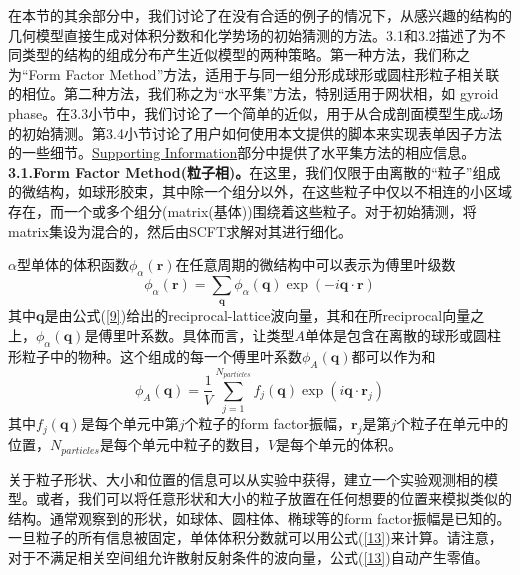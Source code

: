 \documentclass[12pt,a4paper]{article}
\begin{document}
在本节的其余部分中，我们讨论了在没有合适的例子的情况下，从感兴趣的结构的几何模型直接生成对体积分数和化学势场的初始猜测的方法。3.1和3.2描述了为不同类型的结构的组成分布产生近似模型的两种策略。第一种方法，我们称之为“Form Factor Method”方法，适用于与同一组分形成球形或圆柱形粒子相关联的相位。第二种方法，我们称之为“水平集”方法，特别适用于网状相，如 gyroid phase。在3.3小节中，我们讨论了一个简单的近似，用于从合成剖面模型生成$\omega$场的初始猜测。第3.4小节讨论了用户如何使用本文提供的脚本来实现表单因子方法的一些细节。\href{http://pubs.acs.org/doi/suppl/10.1021/acs.macromol.6b00107/suppl_file/ma6b00107_si_001.pdf}{Supporting Information}部分中提供了水平集方法的相应信息。\\
\textbf{3.1.Form Factor Method(粒子相)。}在这里，我们仅限于由离散的“粒子”组成的微结构，如球形胶束，其中除一个组分以外，在这些粒子中仅以不相连的小区域存在，而一个或多个组分(matrix(基体))围绕着这些粒子。对于初始猜测，将matrix集设为混合的，然后由SCFT求解对其进行细化。

$\alpha$型单体的体积函数$\phi _{\alpha}(\mathbf{r})$在任意周期的微结构中可以表示为傅里叶级数
\begin{equation}\label{12}
\phi _{\alpha}(\mathbf{r})=\sum _{\mathbf{q}}\phi _{\alpha}(\mathbf{q})\exp (-i \mathbf{q} \cdot \mathbf{r})
\end{equation}
其中$\mathbf{q}$是由公式(\ref{9})给出的reciprocal-lattice波向量，其和在所reciprocal向量之上，$\phi _{\alpha}(\mathbf{q})$是傅里叶系数。具体而言，让类型$A$单体是包含在离散的球形或圆柱形粒子中的物种。这个组成的每一个傅里叶系数$\phi _{A}(\mathbf{q})$都可以作为和
\begin{equation}\label{13}
\phi _{A}(\mathbf{q})=\frac{1}{V}\sum _{j=1}^{N_{particles}} f_{j}(\mathbf{q})\exp (i \mathbf{q} \cdot \mathbf{r}_j)
\end{equation}
其中$f_{j}(\mathbf{q})$是每个单元中第$j$个粒子的form factor振幅，$\mathbf{r}_j$是第$j$个粒子在单元中的位置，$N_{particles}$是每个单元中粒子的数目，$V$是每个单元的体积。

关于粒子形状、大小和位置的信息可以从实验中获得，建立一个实验观测相的模型。或者，我们可以将任意形状和大小的粒子放置在任何想要的位置来模拟类似的结构。通常观察到的形状，如球体、圆柱体、椭球等的form factor振幅是已知的。一旦粒子的所有信息被固定，单体体积分数就可以用公式(\ref{13})来计算。请注意，对于不满足相关空间组允许散射反射条件的波向量，公式(\ref{13})自动产生零值。
\end{document}
